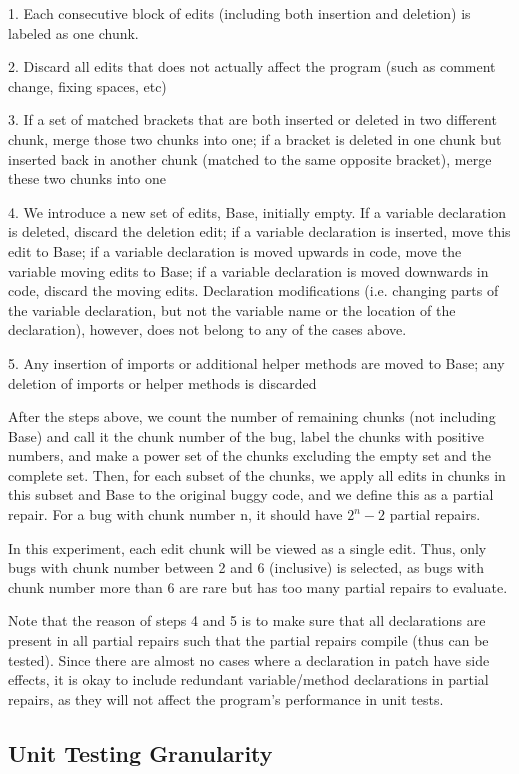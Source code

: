 \documentclass[sigconf, timestamp-false, anonymous=true]{acmart}
\begin{document}
1. Each consecutive block of edits (including both insertion and deletion) is labeled as one chunk.

2. Discard all edits that does not actually affect the program (such as comment change, fixing spaces, etc)

3. If a set of matched brackets that are both inserted or deleted in two different chunk, merge those two chunks into one; if a bracket is deleted in one chunk but inserted back in another chunk (matched to the same opposite bracket), merge these two chunks into one

4. We introduce a new set of edits, Base, initially empty. If a variable declaration is deleted, discard the deletion edit; if a variable declaration is inserted, move this edit to Base; if a variable declaration is moved upwards in code, move the variable moving edits to Base; if a variable declaration is moved downwards in code, discard the moving edits. Declaration modifications (i.e. changing parts of the variable declaration, but not the variable name or the location of the declaration), however, does not belong to any of the cases above.

5. Any insertion of imports or additional helper methods are moved to Base; any deletion of imports or helper methods is discarded

After the steps above, we count the number of remaining chunks (not including Base) and call it the chunk number of the bug, label the chunks with positive numbers, and make a power set of the chunks excluding the empty set and the complete set. Then, for each subset of the chunks, we apply all edits in chunks in this subset and Base to the original buggy code, and we define this as a partial repair. For a bug with chunk number n, it should have $2^n-2$ partial repairs. 

In this experiment, each edit chunk will be viewed as a single edit. Thus, only bugs with chunk number between 2 and 6 (inclusive) is selected, as bugs with chunk number more than 6 are rare but has too many partial repairs to evaluate.

Note that the reason of steps 4 and 5 is to make sure that all declarations are present in all partial repairs such that the partial repairs compile (thus can be tested). Since there are almost no cases where a declaration in patch have side effects, it is okay to include redundant variable/method declarations in partial repairs, as they will not affect the program's performance in unit tests. 

\subsection{Unit Testing Granularity}
\end{document}
